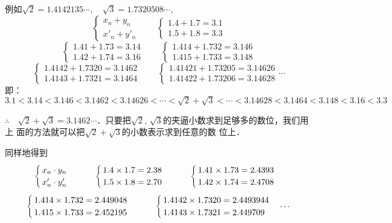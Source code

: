 例如$\sqrt{2}=1.4142135\cdots,\quad \sqrt{3}=1.7320508\cdots$,
\[\begin{cases}
    x_n+y_n\\  x'_n+y'_n
\end{cases}\qquad \begin{cases}
    1.4+1.7=3.1 \\ 1.5+1.8=3.3
\end{cases}\]
\[\begin{cases}
    1.41+1.73=3.14\\1.42+1.74=3.16
\end{cases}\qquad \begin{cases}
    1.414+1.732=3.146\\1.415+1.733=3.148
\end{cases}\]
\[\begin{cases}
    1.4142+1.7320=3.1462\\
1.4143+1.7321=3.1464
\end{cases}\qquad \begin{cases}
    1.41421+1.73205=3.14626\\
1.41422+1.73206=3.14628
\end{cases}\cdots\]
即：
$3.1 <3.14<3.146<3.1462<3.14626<\cdots <\sqrt{2}+\sqrt{3}<\cdots <3.14628<3.1464<3.148<3.16<3.3$

$\therefore\quad \sqrt{2}+\sqrt{3}=3.1462\cdots$．只要把$\sqrt{2}$, $\sqrt{3}$的夹逼小数求到足够多的数位，我们用上
面的方法就可以把$\sqrt{2}+\sqrt{3}$的小数表示求到任意的数
位上．

同样地得到
\[\begin{cases}
    x_n\cdot y_n\\  x'_n\cdot y'_n
\end{cases}\qquad \begin{cases}
    1.4\times 1.7=2.38 \\ 1.5\times 1.8=2.70
\end{cases}\qquad \begin{cases}
    1.41\times 1.73=2.4393\\1.42\times 1.74=2.4708
\end{cases}\]
\[\begin{cases}
    1.414\times 1.732=2.449048\\1.415\times 1.733=2.452195
\end{cases}\qquad \begin{cases}
    1.4142\times 1.7320=2.4493944\\
1.4143\times 1.7321=2.449709
\end{cases}\cdots\]

